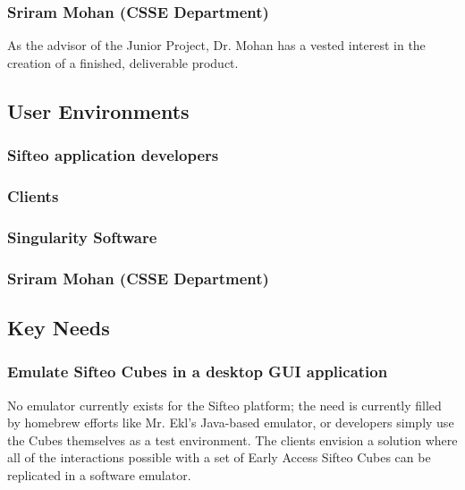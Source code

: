 \documentclass[12pt]{article}
\begin{document}
                          \subsubsection{Sriram Mohan (CSSE Department)}
                          As the advisor of the Junior Project, Dr. Mohan has a vested interest in the creation of a finished, deliverable product.

               \subsection{User Environments}

                          \subsubsection{Sifteo application developers}


                          \subsubsection{Clients}


                          \subsubsection{Singularity Software}


                          \subsubsection{Sriram Mohan (CSSE Department)}


               \subsection{Key Needs}

                          \subsubsection{Emulate Sifteo Cubes in a desktop GUI application}
                          No emulator currently exists for the Sifteo platform; the need is currently filled by homebrew efforts like Mr. Ekl’s Java-based emulator, or developers simply use the Cubes themselves as a test environment. The clients envision a solution where all of the interactions possible with a set of Early Access Sifteo Cubes can be replicated in a software emulator.
\end{document}
